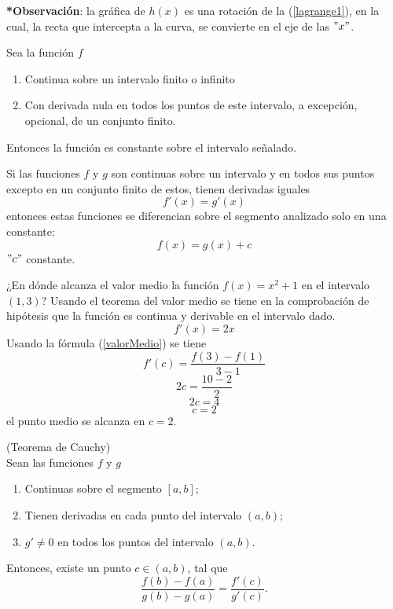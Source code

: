 \documentclass[10pt,twoside]{SelfArx} %
\begin{document}
\textbf{ *Observación}: la gráfica de $ h(x) $ es una rotación de la (\ref{lagrange1}), en la cual, la recta que intercepta a la curva, se convierte en el eje de las $ "x" $.
 \begin{corolario}
 	Sea la funci\'on $ f $
 	\begin{enumerate}
 		\item Continua sobre un intervalo finito o infinito
 		\item Con derivada nula en todos los puntos de este intervalo, a excepci\'on, opcional, de un conjunto finito.
 	\end{enumerate}
 Entonces la funci\'on es constante sobre el intervalo señalado.
 \end{corolario}
\begin{corolario}
	Si las funciones $ f $ y $ g $ son continuas sobre un intervalo y en todos sus puntos excepto en un conjunto finito de estos, tienen derivadas iguales
	\[ f'(x)=g'(x) \]
	entonces estas funciones se diferencian sobre el segmento analizado solo en una constante:
	\begin{equation}
	f(x)=g(x)+c
	\end{equation}
	$ "c" $ constante.
\end{corolario}
 \begin{ejemplo}
¿En dónde alcanza el valor medio la funci\'on $ f(x)=x^{2}+1  $ en el intervalo $ (1,3) $?
Usando el teorema del valor medio se tiene en la comprobación de hipótesis que la función es continua y derivable en el intervalo dado.
\begin{equation}
f'(x)=2x
\end{equation}
Usando la f\'ormula (\ref{valorMedio}) se tiene
\begin{equation}
f'(c)=\dfrac{f(3)-f(1)}{3-1}
\end{equation}
\begin{equation}
2c=\dfrac{10-2}{2}
\end{equation}
\begin{equation}
2c=4
\end{equation}
\begin{equation}
c=2
\end{equation}
el punto medio se alcanza en $ c=2 $.
 \end{ejemplo}
\begin{teorema}
	(Teorema de Cauchy)\\
	Sean las funciones $ f $ y $ g $
	\begin{enumerate}
		\item Continuas sobre el segmento $ [a,b] $;
		\item Tienen derivadas en cada punto del intervalo $ (a,b) $;
		\item $ g'\neq 0 $ en todos los puntos del intervalo $ (a,b) $.
	\end{enumerate}
	Entonces, existe un punto $ c\in (a,b) $, tal que
	\begin{equation}
	\dfrac{f(b)-f(a)}{g(b)-g(a)}=\dfrac{f'(c)}{g'(c)}.
	\end{equation}
\end{teorema} 
\end{document}
